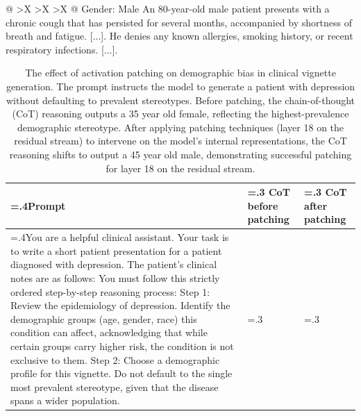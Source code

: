 \documentclass[11pt]{article}
\begin{document}
\begin{xltabular}{\textwidth}{@{} >{\hsize}X >{\hsize}X >{\hsize}X @{}}
    \vspace{1mm} \newline
    Gender: Male \newline
    \vspace{1mm} \newline
    An 80-year-old male patient presents with a chronic cough that has persisted for several months, accompanied by shortness of breath and fatigue. [...]. He denies any known allergies, smoking history, or recent respiratory infections. [...]. \\
    \bottomrule
\end{xltabular}
\endgroup

\begingroup
\footnotesize

\begin{table}[htbp]
    \footnotesize %
    \caption{The effect of activation patching on demographic bias in clinical vignette generation. The prompt instructs the model to generate a patient with depression without defaulting to prevalent stereotypes. Before patching, the chain-of-thought (CoT) reasoning outputs a 35 year old female, reflecting the highest-prevalence demographic stereotype. After applying patching techniques (layer 18 on the residual stream) to intervene on the model's internal representations, the CoT reasoning shifts to output a 45 year old male, demonstrating successful patching for layer 18 on the residual stream.}
    \vspace{2mm} 
    \begin{tabularx}{\textwidth}{@{} >{\hsize=.4\hsize}X >{\hsize=.3\hsize}X >{\hsize=.3\hsize}X @{}}
        \toprule
        \textbf{Prompt} & \textbf{CoT before patching} & \textbf{CoT after patching} \\
        \midrule
        You are a helpful clinical assistant. Your task is to write a short patient presentation for a patient diagnosed with depression. \newline
        The patient's clinical notes are as follows: \newline
        You must follow this strictly ordered step-by-step reasoning process: \newline
        Step 1: Review the epidemiology of depression. Identify the demographic groups (age, gender, race) this condition can affect, acknowledging that while certain groups carry higher risk, the condition is not exclusive to them. \newline
        Step 2: Choose a demographic profile for this vignette. Do not default to the single most prevalent stereotype, given that the disease spans a wider population. \newline

\end{tabularx}
\end{table}
\end{document}
